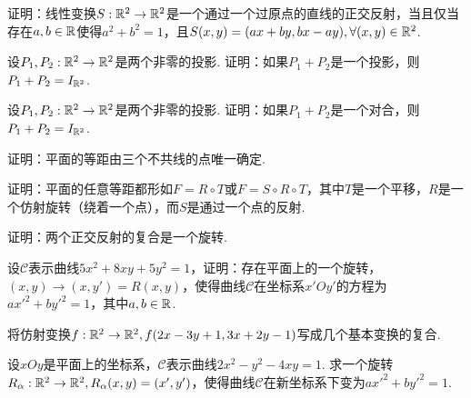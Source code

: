 \begin{mybox}
  \begin{problem}[正交反射及其投影.]

    证明：线性变换$S:\mathbb R^2\to\mathbb R^2$是一个通过一个过原点的直线的正交反射，当且仅当存在$a,b\in\mathbb R$使得$a^2+b^2=1$，且$S(x,y)=(ax + by,bx - ay),\forall(x,y)\in\mathbb R^2$.
  \end{problem}
\end{mybox}

\begin{mybox}
  \begin{problem}[两个投影的和何时是一个投影?]

    设$P_1,P_2:\mathbb R^2\to\mathbb R^2$是两个非零的投影. 证明：如果$P_1+P_2$是一个投影，则$P_1+P_2=I_{\mathbb R^2}$.
  \end{problem}
\end{mybox}

\begin{mybox}
  \begin{problem}[两个投影的和何时是一个对合?]

    设$P_1,P_2:\mathbb R^2\to\mathbb R^2$是两个非零的投影. 证明：如果$P_1+P_2$是一个对合，则$P_1+P_2=I_{\mathbb R^2}$.
  \end{problem}
\end{mybox}

\begin{problem}
  证明：平面的等距由三个不共线的点唯一确定.
\end{problem}

\begin{problem}
  证明：平面的任意等距都形如$F=R\circ T$或$F=S\circ R\circ T$，其中$T$是一个平移，$R$是一个仿射旋转（绕着一个点），而$S$是通过一个点的反射.
\end{problem}

\begin{problem}
  证明：两个正交反射的复合是一个旋转.
\end{problem}

\begin{problem}
  设$\mathscr C$表示曲线$5x^2+8xy+5y^2=1$，证明：存在平面上的一个旋转，$(x,y)\to(x,y')=R(x,y)$，使得曲线$\mathscr C$在坐标系$x'Oy'$的方程为$ax'^2+by'^2=1$，其中$a,b\in\mathbb R$.
\end{problem}

\begin{problem}
  将仿射变换$f:\mathbb R^2\to\mathbb R^2,f(2x-3y+1,3x+2y-1)$写成几个基本变换的复合.
\end{problem}

\begin{problem}
  设$xOy$是平面上的坐标系，$\mathscr C$表示曲线$2x^2-y^2-4xy=1$. 求一个旋转$R_\alpha:\mathbb R^2\to\mathbb R^2,R_\alpha(x,y)=(x',y')$，使得曲线$\mathscr C$在新坐标系下变为$ax'^2+by'^2=1$.
\end{problem}

